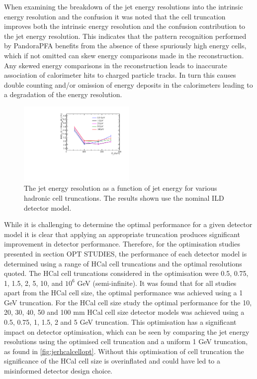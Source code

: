 When examining the breakdown of the jet energy resolutions into the intrinsic energy resolution and the confusion it was noted that the cell truncation improves both the intrinsic energy resolution and the confusion contribution to the jet energy resolution.  This indicates that the pattern recognition performed by PandoraPFA benefits from the absence of these spuriously high energy cells, which if not omitted can skew energy comparisons made in the reconstruction.  Any skewed energy comparisons in the reconstruction leads to inaccurate association of calorimeter hits to charged particle tracks.  In turn this causes double counting and/or omission of energy deposits in the calorimeters leading to a degradation of the energy resolution.  

\begin{figure}
\includegraphics[width=0.5\textwidth]{EnergyEstimators/Plots/CellTruncation/JER_vs_JetEnergy_HCalCellTruncation.pdf}
\caption[The jet energy resolution as a function of jet energy for various hadronic cell truncations.  The results shown use the nominal ILD detector model.]{The jet energy resolution as a function of jet energy for various hadronic cell truncations.  The results shown use the nominal ILD detector model.}
\label{fig:jercelltrunc}
\end{figure}

While it is challenging to determine the optimal performance for a given detector model it is clear that applying an appropriate truncation produces significant improvement in detector performance.  Therefore, for the optimisation studies presented in section OPT STUDIES, the performance of each detector model is determined using a range of HCal cell truncations and the optimal resolutions quoted.  The HCal cell truncations considered in the optimisation were 0.5, 0.75, 1, 1.5, 2, 5, 10, and $10^{6}$ GeV (semi-infinite).  It was found that for all studies apart from the HCal cell size, the optimal performance was achieved using a 1 GeV truncation.  For the HCal cell size study the optimal performance for the 10, 20, 30, 40, 50 and 100 mm HCal cell size detector models was achieved using a 0.5, 0.75, 1, 1.5, 2 and 5 GeV truncation.  This optimisation has a significant impact on detector optimisation, which can be seen by comparing the jet energy resolutions using the optimised cell truncation and a uniform 1 GeV truncation, as found in \ref{fig:jerhcalcellopt}.  Without this optimisation of cell truncation the significance of the HCal cell size is overinflated and could have led to a misinformed detector design choice.  

